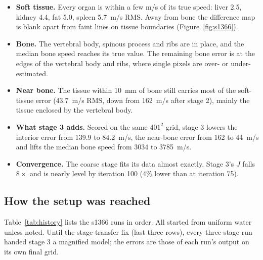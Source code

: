 \documentclass[11pt]{article}
\begin{document}
\begin{itemize}
  \item \textbf{Soft tissue.} Every organ is within a few m/s of its true
    speed: liver 2.5, kidney 4.4, fat 5.0, spleen 5.7~m/s RMS. Away from bone
    the difference map is blank apart from faint lines on tissue boundaries
    (Figure~\ref{fig:s1366}).
  \item \textbf{Bone.} The vertebral body, spinous process and ribs are in
    place, and the median bone speed reaches its true value. The remaining
    bone error is at the edges of the vertebral body and ribs, where single
    pixels are over- or under-estimated.
  \item \textbf{Near bone.} The tissue within 10~mm of bone still carries most
    of the soft-tissue error (43.7~m/s RMS, down from 162~m/s after stage 2),
    mainly the tissue enclosed by the vertebral body.
  \item \textbf{What stage 3 adds.} Scored on the same $401^2$ grid, stage 3
    lowers the interior error from 139.9 to 84.2~m/s, the near-bone error from
    162 to 44~m/s and lifts the median bone speed from 3034 to 3785~m/s.
  \item \textbf{Convergence.} The coarse stage fits its data almost exactly.
    Stage 3's $J$ falls $8\times$ and is nearly level by iteration 100 (4\%
    lower than at iteration 75).
\end{itemize}

\subsection{How the setup was reached}
\label{sec:history}

Table~\ref{tab:history} lists the s1366 runs in order. All started from
uniform water unless noted. Until the stage-transfer fix (last three rows),
every three-stage run handed stage 3 a magnified model; the errors are those
of each run's output on its own final grid.
\end{document}
